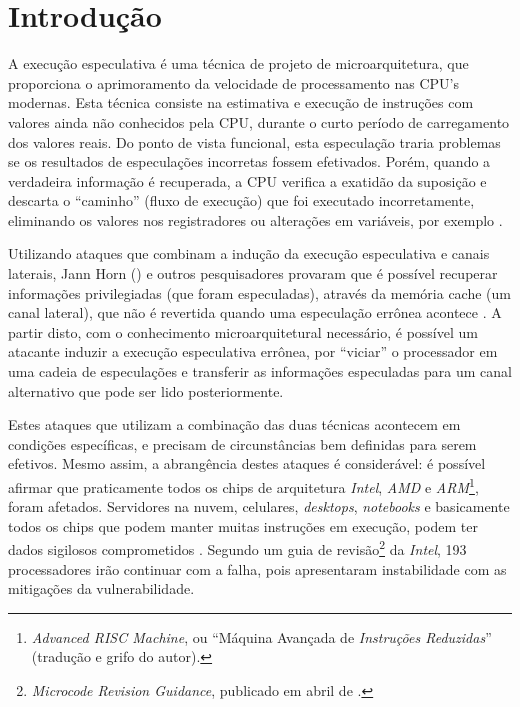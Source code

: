 \documentclass[
	article,			    %
	12pt,				    %
	oneside,			    %
	a4paper,			    %
	chapter=TITLE,		    %
	section=TITLE,		    %
	subsection=TITLE,	    %
	english,			    %
	brazil,				    %
	sumario=tradicional
]{abntex2}
\begin{document}
\textual
\pagestyle{fancy}
\section{Introdução}
A execução especulativa é uma técnica de projeto de microarquitetura, que proporciona o aprimoramento da velocidade de processamento nas CPU's modernas. Esta técnica consiste na estimativa e execução de instruções com valores ainda não conhecidos pela CPU, durante o curto período de carregamento dos valores reais. Do ponto de vista funcional, esta especulação traria problemas se os resultados de especulações incorretas fossem efetivados. Porém, quando a verdadeira informação é recuperada, a CPU verifica a exatidão da suposição e descarta o ``caminho'' (fluxo de execução) que foi executado incorretamente, eliminando os valores nos registradores ou alterações em variáveis, por exemplo \cite{Intel2016Architectures}.

Utilizando ataques que combinam a indução da execução especulativa e canais laterais, Jann Horn (\citeyear{Jann2018Reading}) e outros pesquisadores provaram que é possível recuperar informações privilegiadas (que foram especuladas), através da memória cache (um canal lateral), que não é revertida quando uma especulação errônea acontece \cite{Kocher2018Spectre}. A partir disto, com o conhecimento microarquitetural necessário, é possível um atacante induzir a execução especulativa errônea, por ``viciar'' o processador em uma cadeia de especulações e transferir as informações especuladas para um canal alternativo que pode ser lido posteriormente.

Estes ataques que utilizam a combinação das duas técnicas acontecem em condições específicas, e precisam de circunstâncias bem definidas para serem efetivos. Mesmo assim, a abrangência destes ataques é considerável: é possível afirmar que praticamente todos os chips de arquitetura \emph{Intel}, \emph{AMD} e \emph{ARM}\footnote{\emph{Advanced RISC Machine}, ou ``Máquina Avançada de \emph{Instruções Reduzidas}'' (tradução e grifo do autor).}, foram afetados. Servidores na nuvem, celulares, \emph{desktops}, \emph{notebooks} e basicamente todos os chips que podem manter muitas instruções em execução, podem ter dados sigilosos comprometidos \cite{Graz2018Meltdown}. Segundo um guia de revisão\footnote{\emph{Microcode Revision Guidance}, publicado em abril de \citeyear{Intel2018Microcode}.} da \emph{Intel}, 193 processadores irão continuar com a falha, pois apresentaram instabilidade com as mitigações da vulnerabilidade.
\end{document}

